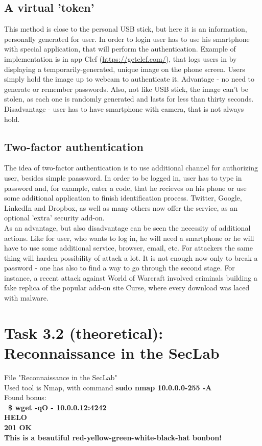 \documentclass{article}
\begin{document}
\subsection*{ A virtual 'token' }
\cite{altern} This method is close to the personal USB stick, but here it is an information, personally generated for user. In order to login user has to use his smartphone with special application, that will perform the authentication. Example of implementation is in app Clef (\url{https://getclef.com/}), that logs users in by displaying a temporarily-generated, unique image on the phone screen. Users simply hold the image up to webcam to authenticate it. Advantage - no need to generate or remember passwords. Also, not like USB stick, the image can't be stolen, as each one is randomly generated and lasts for less than thirty seconds. Disadvantage - user has to have smartphone with camera, that is not always hold.

\subsection*{ Two-factor authentication }
The idea of two-factor authentication is to use additional channel for authorizing user, besides simple paassword. In order to be logged in, user has to type in password and, for example, enter a code, that he recieves on his phone or use some additional application to finish identification process. Twitter, Google, LinkedIn and Dropbox, as well as many others now offer the service, as an optional 'extra' security add-on. 
\\
As an advantage, but also disadvantage can be seen the necessity of additional actions. Like for user, who wants to log in, he will need a smartphone or he will have to use some additional service, browser, email, etc. For attackers the same thing will harden possibility of attack a lot. It is not enough now only to break a password - one has also to find a way to go through the second stage. For instance, a recent attack against World of Warcraft involved criminals building a fake replica of the popular add-on site Curse, where every download was laced with malware. \cite{twofact}

\section*{Task 3.2 (theoretical): Reconnaissance in the SecLab}
File "Reconnaissance in the SecLab"
\\
Used tool is Nmap, with command \textbf{sudo nmap 10.0.0.0-255 -A}
\\
Found bonus:
\\
\textbf {
~\$ wget -qO - 10.0.0.12:4242
\\
HELO
\\
201 OK
\\
This is a beautiful red-yellow-green-white-black-hat bonbon!}
\end{document}

